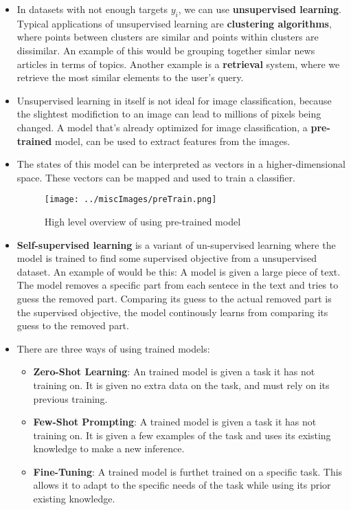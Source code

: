 \documentclass{article}
\newcommand{\tbf}[1]{\textbf{#1}}
\begin{document}
\begin{itemize}
    \item In datasets with not enough targets $y_i$, we can use \tbf{unsupervised learning}. Typical applications of unsupervised learning are \tbf{clustering algorithms}, 
    where points between clusters are similar and points within clusters are dissimilar. An example of this would be grouping together simlar news articles in terms of topics. 
    Another example is a \tbf{retrieval} system, where we retrieve the most similar elements to the user's query.
    \item Unsupervised learning in itself is not ideal for image classification, because the slightest modifiction to an image can lead to millions of pixels being changed. 
    A model that's already optimized for image classification, a \tbf{pre-trained} model, can be used to extract features from the images.
    \item The states of this model can be interpreted as vectors in a higher-dimensional space. These vectors can be mapped and used to train a classifier.
    
    \begin{figure}[h]
        \centering
        \texttt{[image: ../miscImages/preTrain.png]} 
        \caption{High level overview of using pre-trained model}
        \label{fig:example}
    \end{figure}

    \item \tbf{Self-supervised learning} is a variant of un-supervised learning where the model is trained to find some supervised objective from a unsupervised dataset. 
    An example of would be this: A model is given a large piece of text. The model removes a specific part from each sentece in the text and tries to guess the removed part. 
    Comparing its guess to the actual removed part is the supervised objective, the model continously learns from comparing its guess to the removed part.

    \item There are three ways of using trained models:
    
    \begin{itemize}
        \item \tbf{Zero-Shot Learning}: An trained model is given a task it has not training on. It is given no extra data on the task, and must rely on its previous training. 
        \item \tbf{Few-Shot Prompting}: A trained model is given a task it has not training on. It is given a few examples of the task and uses its existing knowledge to make a new inference.
        \item \tbf{Fine-Tuning}: A trained model is furthet trained on a specific task. This allows it to adapt to the specific needs of the task while using its prior existing knowledge.
    \end{itemize}


\end{itemize}
\end{document}
